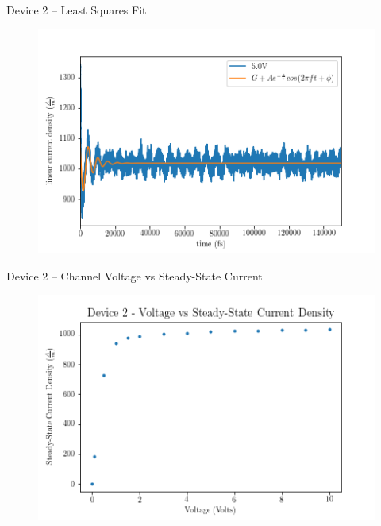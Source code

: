 \documentclass{beamer}
\begin{document}
\begin{frame}{Device 2 -- Least Squares Fit}
    \begin{figure}
        \centering
        \includegraphics[scale=0.5]{Figures/Device_2/Curve_fit/5_0V.png}
        \label{fig:dev_2_fit}
    \end{figure}
\end{frame}

\begin{frame}{Device 2 -- Channel Voltage vs Steady-State Current}
    \begin{figure}
        \centering
        \includegraphics[scale=0.5]{Figures/Device_2/SteadyState.png}
        \label{fig:dev_2_steady}
    \end{figure}
\end{frame}
 
\end{document}
